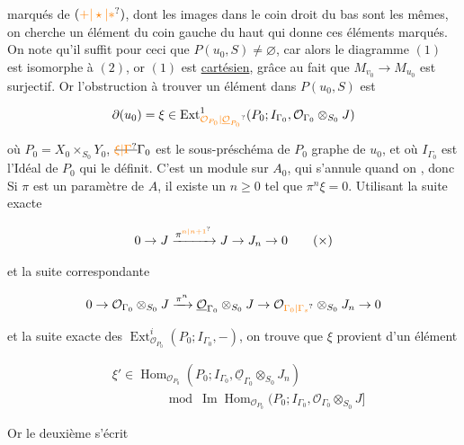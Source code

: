 marqués de $(\unsure{+|\star|\ast})$, dont les images dans le coin droit du bas sont les mêmes, on cherche un élément du coin gauche du haut qui donne ces éléments marqués. On note qu'il suffit pour ceci que $P(u_0,S)\ne\varnothing$, car alors le diagramme $(1)$ est isomorphe à $(2)$, or $(1)$ est \uline{cartésien}, grâce au fait que $M_{v_0}\to M_{u_0}$ est surjectif. Or l'obstruction à trouver un élément dans $P(u_0,S)$ est 

\[
\partial(u_0)=\xi\in\operatorname{Ext}^{1}_{\unsure{\mathcal O_{P_0}|\underline{\mathcal O}_{P_0}}}
(P_0;I_{\Gamma_0},\mathcal O_{\Gamma_0}\otimes_{S_0}J)
\]



où $P_0=X_0\times_{S_0}Y_0$, $\deleted{\unsure{\xi|\Gamma}}\Gamma_0$ est le sous-préschéma de $P_0$ graphe de $u_0$, et où $I_{\Gamma_0}$ est l'Idéal de $P_0$ qui le définit. C'est un module sur $A_0$, qui s'annule quand on , donc Si $\pi$ est un paramètre de $A$, il existe un $n\geq 0$ tel que $\pi^n\xi=0$. Utilisant la suite exacte

\[
0\to J\xrightarrow{\pi^{\unsure{n|n+1}}}J\to J_n\to 0 \tag*{$(\times)$}
\]

et la suite correspondante

\[
0\to\mathcal O_{\Gamma_0}\otimes_{S_0}J\xrightarrow{\pi^n}\underline{\mathcal O}_{\Gamma_0}\otimes_{S_0}J\to\mathcal O_{\unsure{\Gamma_0|\Gamma_s}}\otimes_{S_0}J_n\to0
\]

et la suite exacte des $\operatorname{Ext}^{i}_{\mathcal O_{P_0}}(P_0;I_{\Gamma_0},-)$, on trouve que $\xi$ provient d'un élément

\[
\begin{aligned}
&\xi'\in\operatorname{Hom}_{\mathcal O_{P_0}}(P_0;I_{\Gamma_0},\underline{\mathcal O}_{\Gamma_0}\otimes_{S_0}J_n)\\
&\hspace{4em}\bmod\operatorname{Im}\operatorname{Hom}_{\mathcal O_{P_0}}(P_0;I_{\Gamma_0},\mathcal O_{\Gamma_0}\otimes_{S_0}J]
\end{aligned}
\]

Or le  deuxième  s'écrit


